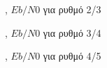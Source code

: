 \begin{figure}[h]
\caption{, $Eb/N0$ για ρυθμό 2/3}
\end{figure}
\begin{figure}[h]
\caption{, $Eb/N0$ για ρυθμό 3/4}
\end{figure}
\begin{figure}[h]
\caption{, $Eb/N0$ για ρυθμό 4/5}
\end{figure}
